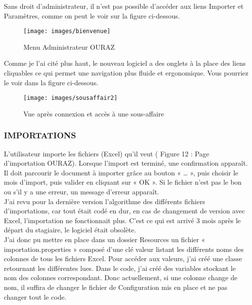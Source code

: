 Sans droit d’administrateur, il n’est pas possible d’accéder aux liens Importer et Paramètres, comme on peut le voir sur la figure ci-dessous.

\begin{figure}[!h]
\begin{center}
\texttt{[image: images/bienvenue]}
\end{center}
\caption{Menu Administrateur OURAZ}
\end{figure}




Comme je l’ai cité plus haut, le nouveau logiciel a des onglets à la place des liens cliquables ce qui permet une navigation plus fluide et ergonomique.
Vous pourriez le voir dans la figure ci-dessous.

\begin{figure}[!h]
\begin{center}
\texttt{[image: images/sousaffair2]}
\end{center}
\caption{Vue après connexion et accès à une sous-affaire}
\end{figure}
 
\subsubsection{IMPORTATIONS}

L’utilisateur importe les fichiers (Excel) qu’il veut ( Figure 12 : Page d’importation OURAZ). Lorsque l’import est terminé, une confirmation apparaît. Il doit parcourir le document à importer grâce au bouton « … », puis choisir le mois d’import, puis valider en cliquant sur « OK ». Si le fichier n’est pas le bon ou s’il y a une erreur, un message d’erreur apparaît.\\

J’ai revu pour la dernière version l’algorithme des différents fichiers d’importations, car tout était codé en dur, en cas de changement de version avec Excel, l’importation ne fonctionnait plus. C’est ce qui est arrivé 3 mois après le départ du stagiaire, le logiciel était obsolète.\\

J’ai donc pu mettre en place dans un dossier Resources un fichier « importation.properties » composé d’une clé valeur listant les différents noms des colonnes de tous les fichiers Excel. Pour accéder aux valeurs, j’ai créé une classe retournant les différentes lues. Dans le code, j’ai créé des variables stockant le nom des colonnes correspondant. Donc actuellement, si une colonne change de nom, il suffira de changer le fichier de Configuration mis en place et ne pas changer tout le code.\\ 


